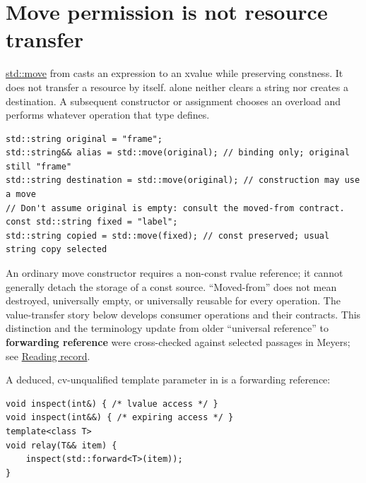 \section{Move permission is not resource transfer}\label{01-foundations-i-ch003-move-permission-is-not-resource-transfer}

\hypertarget{01-foundations-i-ch003-move-permission-is-not-resource-transfer}{}

\hyperref[appendix-0104b704fb11]{std::move} from  casts an expression to an xvalue while preserving constness. It does not transfer a resource by itself.  alone neither clears a string nor creates a destination. A subsequent constructor or assignment chooses an overload and performs whatever operation that type defines.

\begin{verbatim}
std::string original = "frame";
std::string&& alias = std::move(original); // binding only; original still "frame"
std::string destination = std::move(original); // construction may use a move
// Don't assume original is empty: consult the moved-from contract.
const std::string fixed = "label";
std::string copied = std::move(fixed); // const preserved; usual string copy selected
\end{verbatim}

An ordinary  move constructor requires a non-const rvalue reference; it cannot generally detach the storage of a const source. ``Moved-from'' does not mean destroyed, universally empty, or universally reusable for every operation. The value-transfer story below develops consumer operations and their contracts. This distinction and the terminology update from older ``universal reference'' to \textbf{forwarding reference} were cross-checked against selected passages in Meyers; see \hyperref[appendix-a103e7846d21-m008---borrowing-categories-and-const-access]{Reading record}.

A deduced, cv-unqualified template parameter in  is a forwarding reference:

\begin{verbatim}
void inspect(int&) { /* lvalue access */ }
void inspect(int&&) { /* expiring access */ }
template<class T>
void relay(T&& item) {
    inspect(std::forward<T>(item));
}
\end{verbatim}

